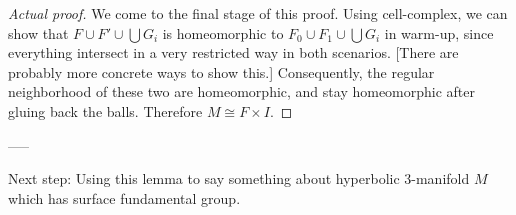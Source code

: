 \documentclass[12pt]{amsart}
\theoremstyle{remark}
\begin{document}
\begin{proof}[Actual proof]
	We come to the final stage of this proof. Using cell-complex, we can show that \(F \cup F' \cup \bigcup G_i\) is homeomorphic to \(F_0 \cup F_1 \cup \bigcup G_i\) in warm-up, since everything intersect in a very restricted way in both scenarios. [There are probably more concrete ways to show this.] Consequently, the regular neighborhood of these two are homeomorphic, and stay homeomorphic after gluing back the balls. Therefore \(M \cong F \times I\). 
\end{proof}


-----


Next step: Using this lemma to say something about hyperbolic 3-manifold \(M\) which has surface fundamental group.
\end{document}
